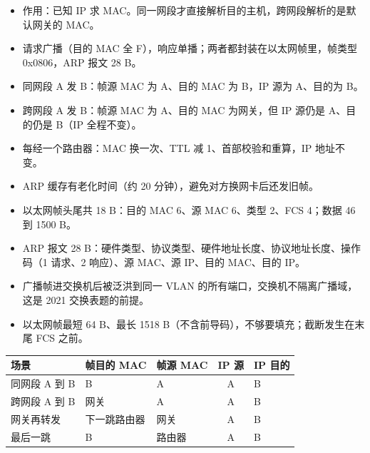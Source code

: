 \documentclass[10pt,a4paper]{ctexart}
\begin{document}
\begin{itemize}

\item 作用：已知 IP 求 MAC。同一网段才直接解析目的主机，跨网段解析的是默认网关的 MAC。

\item 请求广播（目的 MAC 全 F），响应单播；两者都封装在以太网帧里，帧类型 0x0806，ARP 报文 28 B。

\item 同网段 A 发 B：帧源 MAC 为 A、目的 MAC 为 B，IP 源为 A、目的为 B。

\item 跨网段 A 发 B：帧源 MAC 为 A、目的 MAC 为网关，但 IP 源仍是 A、目的仍是 B（IP 全程不变）。

\item 每经一个路由器：MAC 换一次、TTL 减 1、首部校验和重算，IP 地址不变。

\item ARP 缓存有老化时间（约 20 分钟），避免对方换网卡后还发旧帧。

\item 以太网帧头尾共 18 B：目的 MAC 6、源 MAC 6、类型 2、FCS 4；数据 46 到 1500 B。

\item ARP 报文 28 B：硬件类型、协议类型、硬件地址长度、协议地址长度、操作码（1 请求、2 响应）、源 MAC、源 IP、目的 MAC、目的 IP。

\item 广播帧进交换机后被泛洪到同一 VLAN 的所有端口，交换机不隔离广播域，这是 2021 交换表题的前提。

\item 以太网帧最短 64 B、最长 1518 B（不含前导码），不够要填充；截断发生在末尾 FCS 之前。

\end{itemize}

\begin{center}\small
\begin{tabularx}{\linewidth}{@{}>{\raggedright\arraybackslash}Xllcl@{}}
\toprule
场景 & 帧目的 MAC & 帧源 MAC & IP 源 & IP 目的 \\
\midrule
同网段 A 到 B & B & A & A & B \\
跨网段 A 到 B & 网关 & A & A & B \\
网关再转发 & 下一跳路由器 & 网关 & A & B \\
最后一跳 & B & 路由器 & A & B \\
\bottomrule
\end{tabularx}
\end{center}
\end{document}
